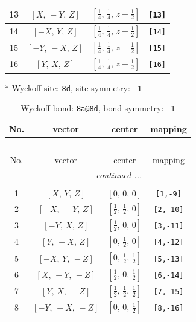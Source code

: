 \documentclass[fleqn,8pt]{jsarticle}
\begin{document}
\begin{longtable}{cccc}
13 & $\left[ X,\, - Y,\, Z \right]$ & $\left[ \frac{1}{4},\, \frac{1}{4},\, z + \frac{1}{2} \right]$ & {\tt [13]} \\ \hline
14 & $\left[ - X,\, Y,\, Z \right]$ & $\left[ \frac{1}{4},\, \frac{1}{4},\, z + \frac{1}{2} \right]$ & {\tt [14]} \\ \hline
15 & $\left[ - Y,\, - X,\, Z \right]$ & $\left[ \frac{1}{4},\, \frac{1}{4},\, z + \frac{1}{2} \right]$ & {\tt [15]} \\ \hline
16 & $\left[ Y,\, X,\, Z \right]$ & $\left[ \frac{1}{4},\, \frac{1}{4},\, z + \frac{1}{2} \right]$ & {\tt [16]} \\
\end{longtable}
* Wyckoff site: {\tt 8d}, site symmetry: {\tt -1}
\renewcommand{\arraystretch}{1.2}
\begin{longtable}{cccc}
\caption{Wyckoff bond: {\tt 8a@8d}, bond symmetry: {\tt -1}}
 \\
 \hline \hline
No. & vector & center & mapping \\ \hline \endfirsthead

\multicolumn{3}{l}{\tablename\ \thetable{}} \\
 \hline \hline
No. & vector & center & mapping \\ \hline \endhead

 \hline \hline
\multicolumn{3}{r}{\footnotesize\it continued ...} \\ \endfoot

 \hline \hline
\multicolumn{3}{r}{} \\ \endlastfoot

1 & $\left[ X,\, Y,\, Z \right]$ & $\left[ 0,\, 0,\, 0 \right]$ & {\tt [1,-9]} \\ \hline
2 & $\left[ - X,\, - Y,\, Z \right]$ & $\left[ \frac{1}{2},\, \frac{1}{2},\, 0 \right]$ & {\tt [2,-10]} \\ \hline
3 & $\left[ - Y,\, X,\, Z \right]$ & $\left[ \frac{1}{2},\, 0,\, 0 \right]$ & {\tt [3,-11]} \\ \hline
4 & $\left[ Y,\, - X,\, Z \right]$ & $\left[ 0,\, \frac{1}{2},\, 0 \right]$ & {\tt [4,-12]} \\ \hline
5 & $\left[ - X,\, Y,\, - Z \right]$ & $\left[ 0,\, \frac{1}{2},\, \frac{1}{2} \right]$ & {\tt [5,-13]} \\ \hline
6 & $\left[ X,\, - Y,\, - Z \right]$ & $\left[ \frac{1}{2},\, 0,\, \frac{1}{2} \right]$ & {\tt [6,-14]} \\ \hline
7 & $\left[ Y,\, X,\, - Z \right]$ & $\left[ \frac{1}{2},\, \frac{1}{2},\, \frac{1}{2} \right]$ & {\tt [7,-15]} \\ \hline
8 & $\left[ - Y,\, - X,\, - Z \right]$ & $\left[ 0,\, 0,\, \frac{1}{2} \right]$ & {\tt [8,-16]} \\
\end{longtable}
\end{document}
